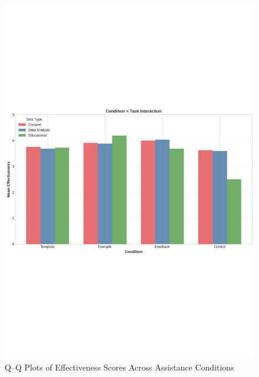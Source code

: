 
\begin{figure}[htbp]
\centering
\includegraphics[width=\textwidth]{pdfs/dwa.pdf}
\caption{Q--Q Plots of Effectiveness Scores Across Assistance Conditions}
\label{figure:qq_plots}
\end{figure}
